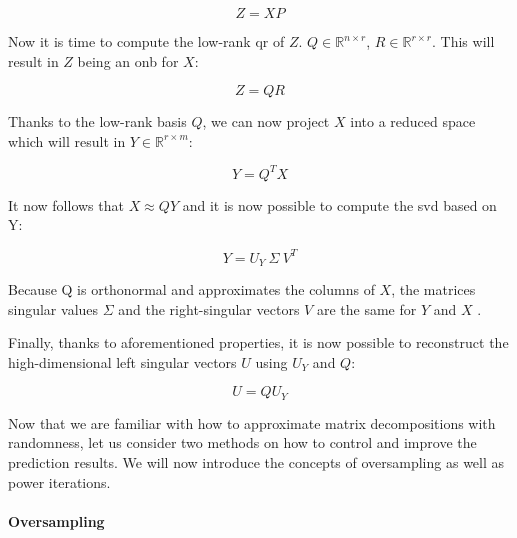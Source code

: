 \vspace{-4mm}
\begin{equation}
	\label{formula:rSVDstepONE}
	Z = X P
\end{equation}

Now it is time to compute the low-rank \gls{qr} of $Z$.
$Q \in \mathbb{R}^{n \times r}$, $R \in \mathbb{R}^{r \times r}$. 
This will result in $Z$ being an \gls{onb} for $X$:

\vspace{-4mm}
\begin{equation}
	\label{formula:rSVDstepTWO}
	Z = Q R
\end{equation}

Thanks to the low-rank basis $Q$, we can now project $X$ into a reduced space which will result in $Y \in \mathbb{R}^{r \times m}$:

\vspace{-4mm}
\begin{equation}
	\label{formula:rSVDstepTHREE}
	Y = Q^T X
\end{equation}

It now follows that $X \approx QY$ \cite{brunton2019data} and it is now possible to compute the \gls{svd} based on Y:

\vspace{-4mm}
\begin{equation}
	\label{formula:rSVDstepFOUR}
	Y = U_Y \ \Sigma \ V^T
\end{equation}

Because Q is orthonormal and approximates the columns of $X$, the matrices singular values $\Sigma$ and the right-singular vectors $V$ are the same for $Y$ and $X$ \cite{brunton2019data}.

Finally, thanks to aforementioned properties, it is now possible to reconstruct the high-dimensional left singular vectors $U$ using $U_Y$ and $Q$:

\vspace{-4mm}
\begin{equation}
	\label{formula:rSVDstepFIVE}
	U = Q U_Y
\end{equation}
\smallskip


Now that we are familiar with how to approximate matrix decompositions with randomness, let us consider two methods on how to control and improve the prediction results.
We will now introduce the concepts of oversampling as well as power iterations.

\paragraph{Oversampling}

